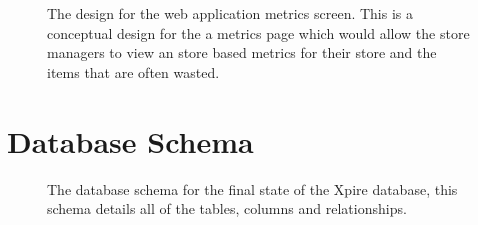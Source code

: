 \documentclass[a4paper,11pt]{report}
\begin{document}
\begin{appendix}
\begin{figure}[H]
            \caption{The design for the web application metrics screen. This is a conceptual design for the a metrics page which would allow the store managers to view an store based metrics for their store and the items that are often wasted.}
            \label{fig:mobileUIpt2}
        \end{figure}

    \chapter{Database Schema}
    \label{appendix:DBSchema}
        \begin{figure}[H]
            \centering
            \caption{The database schema for the final state of the Xpire database, this schema details all of the tables, columns and relationships.}
            \label{fig:mobileUIpt2}
        \end{figure}
     

\end{appendix}
\end{document}

